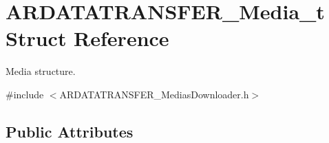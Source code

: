 \hypertarget{struct_a_r_d_a_t_a_t_r_a_n_s_f_e_r___media__t}{}\section{A\+R\+D\+A\+T\+A\+T\+R\+A\+N\+S\+F\+E\+R\+\_\+\+Media\+\_\+t Struct Reference}
\label{struct_a_r_d_a_t_a_t_r_a_n_s_f_e_r___media__t}


Media structure.  




{\ttfamily \#include $<$A\+R\+D\+A\+T\+A\+T\+R\+A\+N\+S\+F\+E\+R\+\_\+\+Medias\+Downloader.\+h$>$}

\subsection*{Public Attributes}
